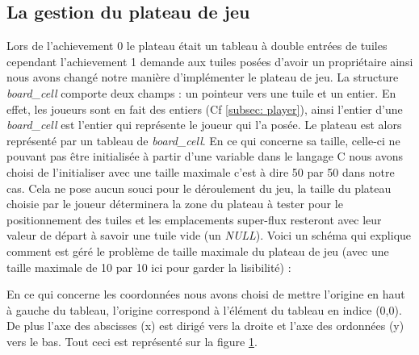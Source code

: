\documentclass[11pt]{article}
\begin{document}
\subsection{La gestion du plateau de jeu}
Lors de l'achievement 0 le plateau était un tableau à double entrées de tuiles cependant l'achievement 1 demande aux tuiles posées d'avoir un propriétaire ainsi nous avons changé notre manière d'implémenter le plateau de jeu. La structure \emph{board\_cell} comporte deux champs : un pointeur vers une tuile et un entier. En effet, les joueurs sont en fait des entiers (Cf \ref{subsec: player}), ainsi l'entier d'une \emph{board\_cell} est l'entier qui représente le joueur qui l'a posée. Le plateau est alors représenté par un tableau de \emph{board\_cell}. En ce qui concerne sa taille, celle-ci ne pouvant pas être initialisée à partir d'une variable dans le langage C nous avons choisi de l'initialiser avec une taille maximale c'est à dire 50 par 50 dans notre cas. Cela ne pose aucun souci pour le déroulement du jeu, la taille du plateau choisie par le joueur déterminera la zone du plateau à tester pour le positionnement des tuiles et les emplacements super-flux resteront avec leur valeur de départ à savoir une tuile vide (un \emph{NULL}). Voici un schéma qui explique comment est géré le problème de taille maximale du plateau de jeu (avec une taille maximale de 10 par 10 ici pour garder la lisibilité) :

\begin{figure}[H] 
\centering
{}
\label{fig: boardsize}
\end{figure}


En ce qui concerne les coordonnées nous avons choisi de mettre l'origine en haut à gauche du tableau, l'origine correspond à l'élément du tableau en indice (0,0). De plus l'axe des abscisses (x) est dirigé vers la droite et l'axe des ordonnées (y) vers le bas. Tout ceci est représenté sur la figure \ref{fig: boardsize}. \\
\end{document}
